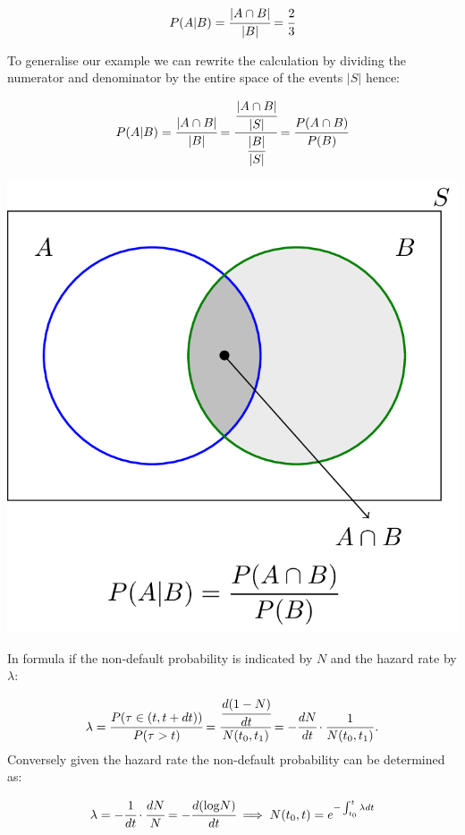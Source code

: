 \[P(A|B) = \cfrac{|A\cap B|}{|B|} = \cfrac{2}{3}\]

To generalise our example we can rewrite the calculation by dividing the
numerator and denominator by the entire space of the events \(|S|\)
hence:

\[P(A|B) = \cfrac{|A\cap B|}{|B|} = \cfrac{\cfrac{|A\cap B|}{|S|}}{\cfrac{|B|}{|S|}} = \cfrac{P(A\cap B)}{P(B)}\]

\begin{center}
\includegraphics[width=0.7\linewidth]{conditional_b.png}
\end{center}

In formula if the non-default probability is indicated by \(N\) and the
hazard rate by \(\lambda\):

\[\lambda = \cfrac{P(\tau\in (t, t+dt))}{P(\tau>t)} = \cfrac{\cfrac{d(1-N)}{dt}}{N(t_0, t_1)} = -\cfrac{dN}{dt}\cdot\frac{1}{N(t_0, t_1)}.\]
Conversely given the hazard rate the non-default probability can be
determined as:

\[\lambda = -\cfrac{1}{dt}\cdot\cfrac{dN}{N} = -\cfrac{d(\textrm{log}N)}{dt} \implies N(t_0, t) = e^{-\int_{t_0}^{t}\lambda dt}\]

